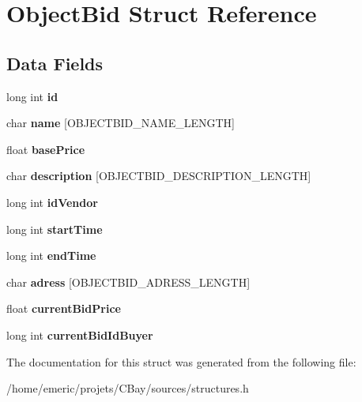 \hypertarget{struct_object_bid}{\section{Object\-Bid Struct Reference}
\label{struct_object_bid}
}
\subsection*{Data Fields}
\begin{DoxyCompactItemize}
\item 
\hypertarget{struct_object_bid_a53f4656a3ccbae3d40e94f582eef745f}{long int {\bfseries id}}\label{struct_object_bid_a53f4656a3ccbae3d40e94f582eef745f}

\item 
\hypertarget{struct_object_bid_a8b0efa1f52a6b46d640cfcf93172083e}{char {\bfseries name} \mbox{[}O\-B\-J\-E\-C\-T\-B\-I\-D\-\_\-\-N\-A\-M\-E\-\_\-\-L\-E\-N\-G\-T\-H\mbox{]}}\label{struct_object_bid_a8b0efa1f52a6b46d640cfcf93172083e}

\item 
\hypertarget{struct_object_bid_ad7e7bdb2bbc09612e2b037a0df5d76dd}{float {\bfseries base\-Price}}\label{struct_object_bid_ad7e7bdb2bbc09612e2b037a0df5d76dd}

\item 
\hypertarget{struct_object_bid_a203af9554762f924c14e5c30b24352a1}{char {\bfseries description} \mbox{[}O\-B\-J\-E\-C\-T\-B\-I\-D\-\_\-\-D\-E\-S\-C\-R\-I\-P\-T\-I\-O\-N\-\_\-\-L\-E\-N\-G\-T\-H\mbox{]}}\label{struct_object_bid_a203af9554762f924c14e5c30b24352a1}

\item 
\hypertarget{struct_object_bid_a56c855fe82a6ab9e09389c23a73eeec0}{long int {\bfseries id\-Vendor}}\label{struct_object_bid_a56c855fe82a6ab9e09389c23a73eeec0}

\item 
\hypertarget{struct_object_bid_a39256f6302441e1a26db958909e7431d}{long int {\bfseries start\-Time}}\label{struct_object_bid_a39256f6302441e1a26db958909e7431d}

\item 
\hypertarget{struct_object_bid_a03ea3a2cebde4b5cae63c7105339c294}{long int {\bfseries end\-Time}}\label{struct_object_bid_a03ea3a2cebde4b5cae63c7105339c294}

\item 
\hypertarget{struct_object_bid_a05eb87542785d73c5aa5cbe4e3a6d262}{char {\bfseries adress} \mbox{[}O\-B\-J\-E\-C\-T\-B\-I\-D\-\_\-\-A\-D\-R\-E\-S\-S\-\_\-\-L\-E\-N\-G\-T\-H\mbox{]}}\label{struct_object_bid_a05eb87542785d73c5aa5cbe4e3a6d262}

\item 
\hypertarget{struct_object_bid_a8864df4945a55f29bb320025d6011cc1}{float {\bfseries current\-Bid\-Price}}\label{struct_object_bid_a8864df4945a55f29bb320025d6011cc1}

\item 
\hypertarget{struct_object_bid_aa79adfae7ada9530c98f5510fc34a0f7}{long int {\bfseries current\-Bid\-Id\-Buyer}}\label{struct_object_bid_aa79adfae7ada9530c98f5510fc34a0f7}

\end{DoxyCompactItemize}


The documentation for this struct was generated from the following file\-:\begin{DoxyCompactItemize}
\item 
/home/emeric/projets/\-C\-Bay/sources/structures.\-h\end{DoxyCompactItemize}
